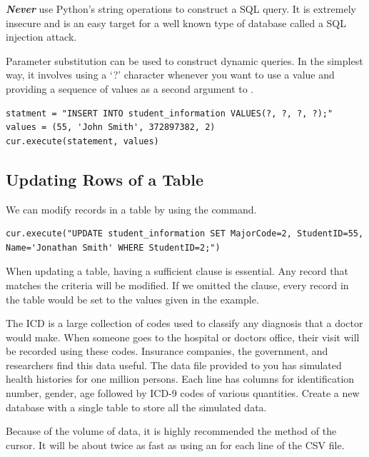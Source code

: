\begin{warn}
\emph{\textbf{Never}} use Python's string operations to construct a SQL query.
It is extremely insecure and is an easy target for a well known type of database called a SQL injection attack.

Parameter substitution can be used to construct dynamic queries.
In the simplest way, it involves using a `?' character whenever you want to use a value and providing a sequence of values as a second argument to .
\begin{lstlisting}
statment = "INSERT INTO student_information VALUES(?, ?, ?, ?);"
values = (55, 'John Smith', 372897382, 2)
cur.execute(statement, values)
\end{lstlisting}
\end{warn}

\subsection*{Updating Rows of a Table}
We can modify records in a table by using the  command.
\begin{lstlisting}
cur.execute("UPDATE student_information SET MajorCode=2, StudentID=55, Name='Jonathan Smith' WHERE StudentID=2;")
\end{lstlisting}

\begin{info}
When updating a table, having a sufficient  clause is essential.  Any record that matches the criteria will be modified.
If we omitted the  clause, every record in the table would be set to the values given in the example.
\end{info}

\begin{problem}
The ICD is a large collection of codes used to classify any diagnosis that a doctor would make.
When someone goes to the hospital or doctors office, their visit will be recorded using these codes.
Insurance companies, the government, and researchers find this data useful.
The data file provided to you has simulated health histories for one million persons.
Each line has columns for identification number, gender, age followed by ICD-9 codes of various quantities.
Create a new database with a single table to store all the simulated data.

Because of the volume of data, it is highly recommended the  method of the cursor.
It will be about twice as fast as using an  for each line of the CSV file.
\label{prob:icd9tables}
\end{problem}

